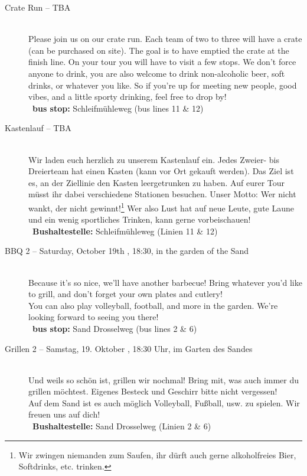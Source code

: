 \begin{description}
\ifml
\item[Crate Run -- TBA]~\\ %
    Please join us on our crate run.
    Each team of two to three will have a crate (can be purchased on site).
    The goal is to have emptied the crate at the finish line.
    On your tour you will have to visit a few stops.
    We don't force anyone to drink, you are also welcome to drink non-alcoholic beer, soft drinks, or whatever you like.
    So if you're up for meeting new people, good vibes, and a little sporty drinking, feel free to drop by! \\
    ~\textbf{bus stop:} Schleifmühleweg (bus lines 11 \& 12)
\else
\item[Kastenlauf -- TBA]~\\ %
    Wir laden euch herzlich zu unserem Kastenlauf ein.
    Jedes Zweier- bis Dreierteam hat einen Kasten (kann vor Ort gekauft werden).
    Das Ziel ist es, an der Ziellinie den Kasten leergetrunken zu haben.
    Auf eurer Tour müsst ihr dabei verschiedene Stationen besuchen.
    Unser Motto: Wer nicht wankt, der nicht gewinnt!\footnote{Wir zwingen niemanden zum Saufen, ihr dürft auch gerne alkoholfreies Bier, Softdrinks, etc. trinken.}
    Wer also Lust hat auf neue Leute, gute Laune und ein wenig sportliches Trinken, kann gerne vorbeischauen! \\
    ~\textbf{Bushaltestelle:} Schleifmühleweg (Linien 11 \& 12)
\fi

\ifml
    \item[BBQ 2 -- Saturday, October 19th \YEAR, 18:30, in the garden of the Sand]~\\
    Because it's so nice, we'll have another barbecue!
    Bring whatever you'd like to grill, and don’t forget your own plates and cutlery!\\
    You can also play volleyball, football, and more in the garden. We’re looking forward to seeing you there!\\
    ~\textbf{bus stop:} Sand Drosselweg (bus lines 2 \& 6)
\else
    \item[Grillen 2 -- Samstag, 19. Oktober \YEAR, 18:30 Uhr, im Garten des Sandes]~\\
    Und weils so schön ist, grillen wir nochmal!
    Bring mit, was auch immer du grillen möchtest. Eigenes Besteck und Geschirr bitte nicht vergessen!\\
    Auf dem Sand ist es auch möglich Volleyball, Fußball, usw. zu spielen. Wir freuen uns auf dich!\\
    ~\textbf{Bushaltestelle:} Sand Drosselweg (Linien 2 \& 6)
\fi


\end{description}
